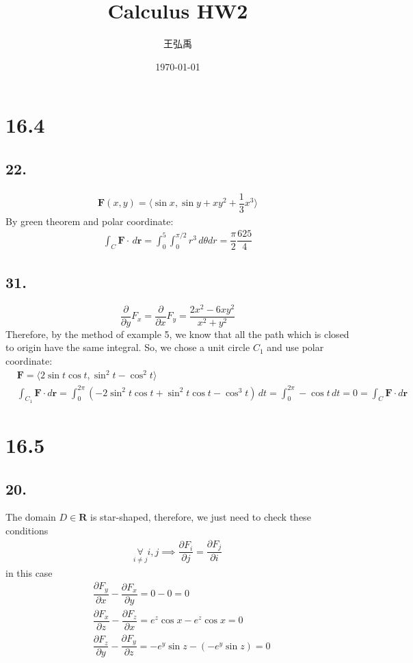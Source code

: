 \documentclass[12pt, a4paper]{article}
\title{\textbf{Calculus HW2}}
\author{王弘禹}
\date\today
\begin{document}
\begin{CJK*}{UTF8}{bsmi}
\linespread{1.5}
\maketitle
\newcommand{\st}[1]{\section*{#1}}
\newcommand{\sst}[1]{\subsection*{#1}}
\newcommand{\ssst}[1]{\subsubsection*{#1}}
\newcommand{\dsp}{\displaystyle}
\newcommand{\dx}{\,dx}
\newcommand{\dphi}{\,d\phi}
\newcommand{\dtheta}{\,d\theta}
\newcommand{\dy}{\,dy}
\newcommand{\dz}{\,dz}
\newcommand{\dr}{\,dr}
\newcommand{\drho}{\,d\rho}
\newcommand{\dt}{\,dt}
\newcommand{\tb}{\textbf}
\st{16.4}
\sst{22.}
\begin{align}
    \textbf{F}(x,y)=\langle\sin x,\sin y+xy^2+\dfrac{1}{3}x^3\rangle
\end{align}
By green theorem and polar coordinate:
\begin{align}
    \int_C \textbf{F}\cdot \,d\textbf{r} = \int_0^5\int_0^{\pi/2}r^3\dtheta dr=\dfrac{\pi}{2}\dfrac{625}{4}
\end{align}
\sst{31.}
\begin{equation}
    \dfrac{\partial}{\partial y}F_x=\dfrac{\partial }{\partial x}F_y = \dfrac{2x^2-6xy^2}{x^2+y^2}
\end{equation}
Therefore, by the method of example 5, we know that all the path which is closed to origin have the same integral. So, we chose a unit circle $C_1$ and use polar coordinate:
\begin{align}
    &\textbf{F} = \langle 2\sin t\cos t, \sin^2 t-\cos^2 t\rangle\\
    &\int_{C_1}\textbf{F}\cdot d\textbf{r}=\int_0^{2\pi} (-2\sin^2 t\cos t+\sin^2 t\cos t-\cos^3 t)\dt=\int_0^{2\pi}-\cos t\dt =0=\int_{C}\textbf{F}\cdot d\textbf{r}
\end{align}

\st{16.5}
\sst{20.}
The domain $D\in\textbf{R}$ is star-shaped, therefore, we just need to check these conditions
\begin{align}
    \mathop{\forall}\limits_{i\ne j} i,j\implies \dfrac{\partial F_i}{\partial j}=\dfrac{\partial F_j}{\partial i}
\end{align}
in this case
\begin{align}
    &\dfrac{\partial F_y}{\partial x} - \dfrac{\partial F_x}{\partial y} = 0-0=0\\
    &\dfrac{\partial F_x}{\partial z} - \dfrac{\partial F_z}{\partial x} = e^z\cos x - e^z \cos x=0\\
    &\dfrac{\partial F_z}{\partial y} - \dfrac{\partial F_y}{\partial z} = -e^y\sin z - (-e^y\sin z) = 0
\end{align}



\end{CJK*}
\end{document}
